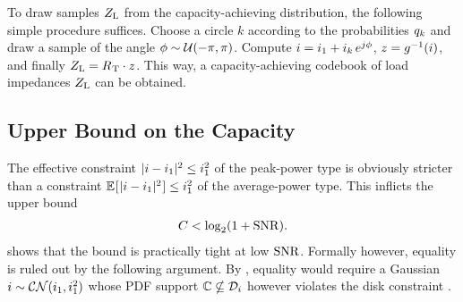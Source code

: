 

To draw samples $Z_\mathrm{L}$ from the capacity-achieving distribution, the following simple procedure suffices. Choose a circle $k$ according to the probabilities $q_k$ and draw a sample of the angle $\phi \sim \mathcal{U}(-\pi,\pi)$. Compute $i = i_1 + i_k\, e^{j\phi}$, \mbox{$z = g^{-1}(i)$}, and finally $Z_\mathrm{L} = R_{\hspace{.2mm}\mathrm{T}} \cdot z$. This way, a capacity-achieving codebook of load impedances $Z_\mathrm{L}$ can be obtained.

\subsection{Upper Bound on the Capacity}

The effective constraint $|i - i_1|^2 \leq i_1^2$ of the peak-power type is obviously stricter than a constraint $\mathbb{E}_{}[\hspace{.2mm}|i - i_1|^2\hspace{.2mm}] \leq i_1^2$ of the average-power type. This inflicts the upper bound \cite{ShamaiTIT1995}
\begin{align}
C < \log_2(1 + \mathrm{SNR}).
\label{eq:UpperBound}
\end{align}
 shows that the bound is practically tight at low $\mathrm{SNR}$. Formally however, equality is ruled out by the following argument. By \cite[Appendix~B.4]{Tse2005}, equality would require a Gaussian $i \sim \mathcal{CN}(i_1, i_1^2)$ whose PDF support $\mathbb{C} \nsubseteq \mathcal{D}_i$ however violates the disk constraint .

